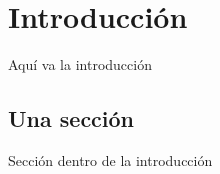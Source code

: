 \chapter{Introducción}
Aquí va la introducción

\section{Una sección}
Sección dentro de la introducción
